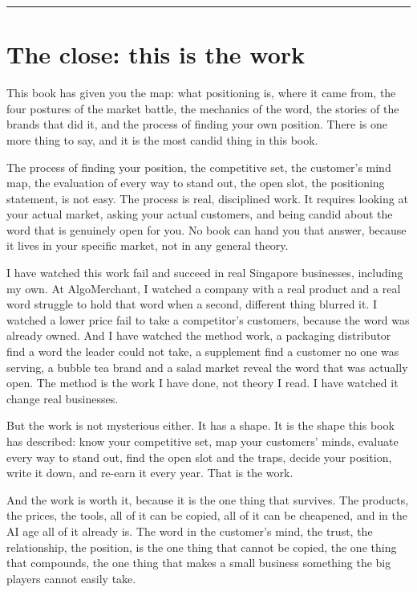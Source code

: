\documentclass[10pt,twoside,openany]{memoir}
\begin{document}
{{{{{\begin{center}\rule{0.5\linewidth}{0.5pt}\end{center}

\FloatBarrier
\chapter{The close: this is the work}\label{the-close-this-is-the-work}

This book has given you the map: what positioning is, where it came
from, the four postures of the market battle, the mechanics of the word,
the stories of the brands that did it, and the process of finding your
own position. There is one more thing to say, and it is the most candid
thing in this book.

The process of finding your position, the competitive set, the
customer's mind map, the evaluation of every way to stand out, the open
slot, the positioning statement, is not easy. The process is real,
disciplined work. It requires looking at your actual market, asking your
actual customers, and being candid about the word that is genuinely open
for you. No book can hand you that answer, because it lives in your
specific market, not in any general theory.

I have watched this work fail and succeed in real Singapore businesses,
including my own. At AlgoMerchant, I watched a company with a real
product and a real word struggle to hold that word when a second,
different thing blurred it. I watched a lower price fail to take a
competitor's customers, because the word was already owned. And I have
watched the method work, a packaging distributor find a word the leader
could not take, a supplement find a customer no one was serving, a
bubble tea brand and a salad market reveal the word that was actually
open. The method is the work I have done, not theory I read. I have
watched it change real businesses.

But the work is not mysterious either. It has a shape. It is the shape
this book has described: know your competitive set, map your customers'
minds, evaluate every way to stand out, find the open slot and the
traps, decide your position, write it down, and re-earn it every year.
That is the work.

And the work is worth it, because it is the one thing that survives. The
products, the prices, the tools, all of it can be copied, all of it can
be cheapened, and in the AI age all of it already is. The word in the
customer's mind, the trust, the relationship, the position, is the one
thing that cannot be copied, the one thing that compounds, the one thing
that makes a small business something the big players cannot easily
take.

}}}}}
\end{document}
